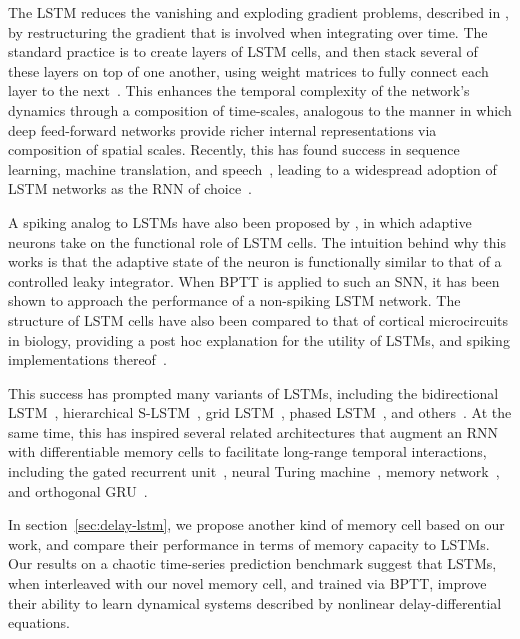 The LSTM reduces the vanishing and exploding gradient problems, described in \citet{bengio1994learning}, by restructuring the gradient that is involved when integrating over time.
The standard practice is to create layers of LSTM cells, and then stack several of these layers on top of one another, using weight matrices to fully connect each layer to the next~\citep{graves2013speech}.
This enhances the temporal complexity of the network's dynamics through a composition of time-scales, analogous to the manner in which deep feed-forward networks provide richer internal representations via composition of spatial scales.
Recently, this has found success in sequence learning, machine translation, and speech~\citep{graves2013speech, sutskever2014sequence, cho2014learning, bahdanau2014neural}, leading to a widespread adoption of LSTM networks as the RNN of choice~\citep{lecun2015deep}.

A spiking analog to LSTMs have also been proposed by \citet{bellec2018long}, in which adaptive neurons take on the functional role of LSTM cells.
The intuition behind why this works is that the adaptive state of the neuron is functionally similar to that of a controlled leaky integrator.
When BPTT is applied to such an SNN, it has been shown to approach the performance of a non-spiking LSTM network.
The structure of LSTM cells have also been compared to that of cortical microcircuits in biology, providing a post hoc explanation for the utility of LSTMs, and spiking implementations thereof~\citep{costa2017cortical, pozzi2018gating}.

This success has prompted many variants of LSTMs, including the bidirectional LSTM~\citep{graves2005framewise}, hierarchical S-LSTM~\citep{zhu2015long}, grid LSTM~\citep{kalchbrenner2015grid}, phased LSTM~\citep{neil2016phased}, and others~\citep{salehinejad2017recent}.
At the same time, this has inspired several related architectures that augment an RNN with differentiable memory cells to facilitate long-range temporal interactions, including the gated recurrent unit~\citep[GRU;][]{cho2014properties, chung2014empirical}, neural Turing machine~\citep{graves2014neural}, memory network~\citep{weston2014memory}, and orthogonal GRU~\citep{jing2018gated}.

In section~\ref{sec:delay-lstm}, we propose another kind of memory cell based on our work, and compare their performance in terms of memory capacity to LSTMs.
Our results on a chaotic time-series prediction benchmark suggest that LSTMs, when interleaved with our novel memory cell, and trained via BPTT, improve their ability to learn dynamical systems described by nonlinear delay-differential equations.

